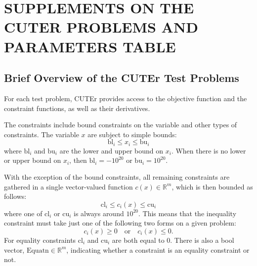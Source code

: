  
\appendix    %


\chapter{SUPPLEMENTS ON THE CUTER PROBLEMS AND PARAMETERS TABLE}

\section{Brief Overview of the CUTEr Test Problems}\label{sec:cuternm}
For each test problem, CUTEr provides access to the objective function and the constraint functions, as well as their derivatives.

The constraints include bound constraints on the variable and other types of constraints. The variable $x$ are subject to simple bounds:
\begin{equation*}
\text{bl}_i \leq x_i \leq \text{bu}_i  
\end{equation*}
where $\text{bl}_i$ and $\text{bu}_i$ are the lower and upper bound on $x_i$. When there is no lower or upper bound on $x_i$, then $\text{bl}_i = -10^{20}$ or $\text{bu}_i = 10^{20}$. 

With the exception of the bound constraints, all remaining 
constraints are gathered in a single vector-valued function $c(x) \in \mathbb{R}^m$, which is then bounded as follows:   
\begin{equation*}
\text{cl}_i \leq c_i(x) \leq \text{cu}_i  
\end{equation*}
where one of $\text{cl}_i$ or $\text{cu}_i$ is always around $10^{20}$. This means that the inequality constraint must take just one of 
the following two forms on a given problem:
\begin{equation*}
c_i(x) \geq 0   \quad  \text{or}  \quad  c_i(x) \leq 0.
\end{equation*}
For equality constraints $\text{cl}_i$ and $\text{cu}_i$ are both equal to 0. There is also a bool vector, $\text{Equatn} \in \mathbb{R}^m$, indicating whether a constraint is an equality constraint or not. 

